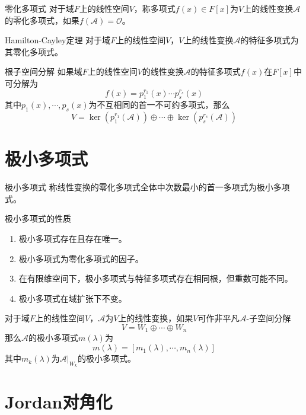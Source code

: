 \documentclass[lang = cn, scheme = chinese, thmcnt = section]{elegantbook}
\begin{document}
\begin{definition}{零化多项式}
	对于域$F$上的线性空间$V$，称多项式$f(x)\in F[x]$为$V$上的线性变换$\mathscr{A}$的零化多项式，如果$f(\mathscr{A})=\mathscr{O}$。
\end{definition}

\begin{theorem}{Hamilton-Cayley定理}
	对于域$F$上的线性空间$V$，$V$上的线性变换$\mathscr{A}$的特征多项式为其零化多项式。
\end{theorem}

\begin{theorem}{根子空间分解}
	如果域$F$上的线性空间$V$的线性变换$\mathscr{A}$的特征多项式$f(x)$在$F[x]$中可分解为%
	$$
	f(x)=p_1^{r_1}(x)\cdots p_s^{r_s}(x)
	$$
	其中$p_1(x),\cdots, p_s(x)$为不互相同的首一不可约多项式，那么%
	$$
	V=\ker(p_1^{r_1}(\mathscr{A}))\oplus\cdots\oplus \ker(p_s^{r_s}(\mathscr{A}))
	$$
\end{theorem}

\section{极小多项式}

\begin{definition}{极小多项式}
	称线性变换的零化多项式全体中次数最小的首一多项式为极小多项式。
\end{definition}

\begin{proposition}{极小多项式的性质}
	\begin{enumerate}
		\item 极小多项式存在且存在唯一。
		\item 极小多项式为零化多项式的因子。
		\item 在有限维空间下，极小多项式与特征多项式存在相同根，但重数可能不同。
		\item 极小多项式在域扩张下不变。
	\end{enumerate}
\end{proposition}

\begin{theorem}
	对于域$F$上的线性空间$V$，$\mathscr{A}$为$V$上的线性变换，如果$V$可作非平凡$\mathscr{A}$-子空间分解%
	$$
	V=W_1\oplus \cdots \oplus W_n
	$$
	那么$\mathscr{A}$的极小多项式$m(\lambda)$为%
	$$
	m(\lambda)=[m_1(\lambda),\cdots,m_n(\lambda)]
	$$
	其中$m_k(\lambda)$为$\mathscr{A}|_{W_k}$的极小多项式。
\end{theorem}

\section{Jordan对角化}
\end{document}
